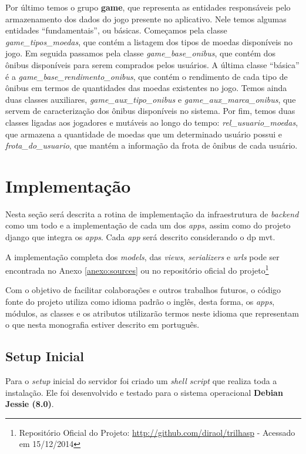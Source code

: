Por último temos o grupo \textbf{game}, que representa as entidades responsáveis pelo armazenamento dos dados do jogo presente no aplicativo. Nele temos algumas entidades ``fundamentais'', ou básicas. Começamos pela classe \textit{game\_tipos\_moedas}, que contém a listagem dos tipos de moedas disponíveis no jogo. Em seguida passamos pela classe \textit{game\_base\_onibus}, que contém dos ônibus disponíveis para serem comprados pelos usuários. A última classe ``básica'' é a \textit{game\_base\_rendimento\_onibus}, que contém o rendimento de cada tipo de ônibus em termos de quantidades das moedas existentes no jogo. Temos ainda duas classes auxiliares, \textit{game\_aux\_tipo\_onibus} e \textit{game\_aux\_marca\_onibus}, que servem de caracterização dos ônibus disponíveis no sistema. Por fim, temos duas classes ligadas aos jogadores e mutáveis ao longo do tempo: \textit{rel\_usuario\_moedas}, que armazena a quantidade de moedas que um determinado usuário possui e \textit{frota\_do\_usuario}, que mantém a informação da frota de ônibus de cada usuário.

\clearpage
\section{Implementação}\label{sec:estrutura-app}
Nesta seção será descrita a rotina de implementação da infraestrutura de \textit{backend} como um todo e a implementação de cada um dos \textit{apps}, assim como do projeto \gls{django} que integra os \textit{apps}. Cada \textit{app} será descrito considerando o \gls{dp} \gls{mvt}.

A implementação completa dos \textit{models}, das \textit{views}, \textit{serializers} e \textit{urls} pode ser encontrada no Anexo \ref{anexo:sources} ou no repositório oficial do projeto\footnote{Repositório Oficial do Projeto: \url{http://github.com/diraol/trilhasp} - Acessado em 15/12/2014}

Com o objetivo de facilitar colaborações e outros trabalhos futuros, o código fonte do projeto utiliza como idioma padrão o inglês, desta forma, os \textit{apps}, módulos, as classes e os atributos utilizarão termos neste idioma que representam o que nesta monografia estiver descrito em português.

\subsection{Setup Inicial}
Para o \textit{setup} inicial do servidor foi criado um \textit{shell script} que realiza toda a instalação. Ele foi desenvolvido e testado para o sistema operacional \textbf{Debian Jessie (8.0)}.

